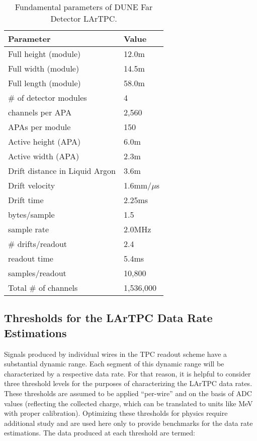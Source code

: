\begin{table}[ht!]
	\centering
	\begin{tabular}{| p{2.5in} | p{1in} |}
		\hline
		\textbf{Parameter} & \textbf{Value} \\ \hline
		Full height (module) & 12.0m \\ \hline
		Full width (module) & 14.5m \\ \hline
		Full length (module) & 58.0m \\ \hline
		\# of detector modules & 4 \\ \hline
		\hline
		channels per APA & 2,560 \\ \hline
		APAs per module & 150 \\ \hline
		Active height (APA) & 6.0m \\ \hline
		Active width (APA) & 2.3m \\ \hline  \hline
		Drift distance in Liquid Argon & 3.6m \\
		\hline
		Drift velocity & 1.6mm/$\mu$s \\ \hline
		Drift time & 2.25ms \\ \hline
		\hline
		bytes/sample & 1.5 \\ \hline
		sample rate & 2.0MHz \\ \hline
		\# drifts/readout & 2.4 \\ \hline
		\hline
		readout time & 5.4ms \\ \hline
		samples/readout & 10,800 \\
		\hline \hline
		Total \# of channels & 1,536,000 \\
		\hline
	\end{tabular}
	\caption{Fundamental parameters of DUNE Far Detector LArTPC.}
	\label{tab:fundamental-parameters}
\end{table}

\subsection{Thresholds for the LArTPC Data Rate Estimations}

Signals produced by individual wires in the TPC readout scheme have a substantial
dynamic range. Each segment of this dynamic range will be characterized by a
respective data rate. For that reason, it is helpful to consider three threshold levels
for the purposes of characterizing the LArTPC data rates. These thresholds are assumed to be applied ``per-wire'' and on the basis of ADC values (reflecting the collected charge,
which can be translated to units like MeV with proper calibration). Optimizing these thresholds for physics require additional study and are used here only to provide benchmarks for the data rate estimations.
The data produced at each threshold are termed:

